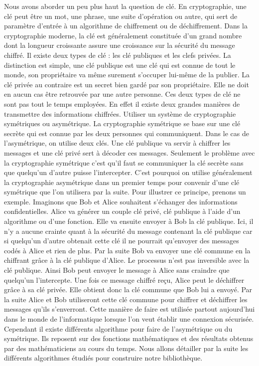 Nous avons aborder un peu plus haut la question de clé. En cryptographie, une clé peut être un mot, une phrase, une suite d’opération ou autre, qui sert de paramètre d’entrée à un algorithme de chiffrement ou de déchiffrement. Dans la cryptographie moderne, la clé est généralement constituée d’un grand nombre dont la longueur croissante assure une croissance sur la sécurité du message chiffré. Il existe deux types de clé : les clé publiques et les clefs privées. La distinction est simple, une clé publique est une clé qui est connue de tout le monde, son propriétaire va même surement s’occuper lui-même de la publier. La clé privée au contraire est un secret bien gardé par son propriétaire. Elle ne doit en aucun cas être retrouvée par une autre personne. Ces deux types de clé ne sont pas tout le temps employées. En effet il existe deux grandes manières de transmettre des informations chiffrées. Utiliser un système de cryptographie symétriques ou asymétrique. La cryptographie symétrique se base sur une clé secrète qui est connue par les deux personnes qui communiquent. Dans le cas de l’asymétrique, on utilise deux clés. Une clé publique va servir à chiffrer les messages et une clé privé sert à décoder ces messages. Seulement le problème avec la cryptographie symétrique c’est qu’il faut se communiquer la clé secrète sans que quelqu’un d’autre puisse l’intercepter. C’est pourquoi on utilise généralement la cryptographie asymétrique dans un premier temps pour convenir d’une clé symétrique que l’on utilisera par la suite. Pour illustrer ce principe, prenons un exemple. Imaginons que Bob et Alice souhaitent s’échanger des informations confidentielles. Alice va générer un couple clé privé, clé publique à l’aide d’un algorithme ou d’une fonction. Elle va ensuite envoyer à Bob la clé publique. Ici, il n’y a aucune crainte quant à la sécurité du message contenant la clé publique car si quelqu’un d’autre obtenait cette clé il ne pourrait qu’envoyer des messages codés à Alice et rien de plus. Par la suite Bob va envoyer une clé commune en la chiffrant grâce à la clé publique d’Alice. Le processus n’est pas inversible avec la clé publique. Ainsi Bob peut envoyer le message à Alice sans craindre que quelqu’un l’intercepte. Une fois ce message chiffré reçu, Alice peut le déchiffrer grâce à sa clé privée. Elle obtient donc la clé commune que Bob lui a envoyé. Par la suite Alice et Bob utiliseront cette clé commune pour chiffrer et déchiffrer les messages qu’ils s’enverront. Cette manière de faire est utilisée partout aujourd’hui dans le monde de l’informatique lorsque l’on veut établir une connexion sécurisée. Cependant il existe différents algorithme pour faire de l’asymétrique ou du symétrique. Ils reposent sur des fonctions mathématiques et des résultats obtenus par des mathématiciens au cours du temps. Nous allons détailler par la suite les différents algorithmes étudiés pour construire notre bibliothèque.


